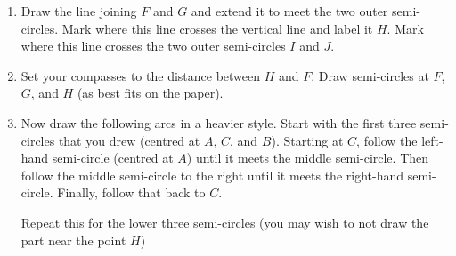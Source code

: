 \documentclass{article}
\newcounter{tree}
\begin{document}
\begin{enumerate}
\begin{multicols}{2}
\columnbreak
{}
\end{multicols}

\item
\begin{multicols}{2}
Draw the line joining \(F\) and \(G\) and extend it to meet the two outer semi-circles.
Mark where this line crosses the vertical line and label it \(H\).
Mark where this line crosses the two outer semi-circles \(I\) and \(J\).

\columnbreak
{}
\end{multicols}

\item
\begin{multicols}{2}
Set your compasses to the distance between \(H\) and \(F\).
Draw semi-circles at \(F\), \(G\), and \(H\) (as best fits on the paper).

\columnbreak
{}
\end{multicols}

\item
\begin{multicols}{2}
Now draw the following arcs in a heavier style.
Start with the first three semi-circles that you drew (centred at \(A\), \(C\), and \(B\)).
Starting at \(C\), follow the left-hand semi-circle (centred at \(A\)) until it meets the middle semi-circle.
Then follow the middle semi-circle to the right until it meets the right-hand semi-circle.
Finally, follow that back to \(C\).

Repeat this for the lower three semi-circles (you may wish to not draw the part near the point \(H\))

\columnbreak
{}
\end{multicols}

\end{enumerate}
\end{document}
